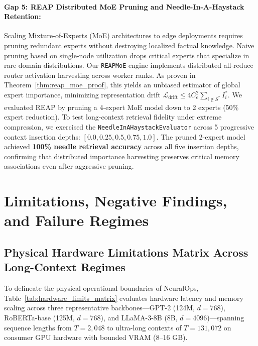 \documentclass{article}
\begin{document}
\paragraph{Gap 5: REAP Distributed MoE Pruning and Needle-In-A-Haystack Retention:}
Scaling Mixture-of-Experts (MoE) architectures to edge deployments requires pruning redundant experts without destroying localized factual knowledge. Naive pruning based on single-node utilization drops critical experts that specialize in rare domain distributions. 
Our \texttt{REAPMoE} engine implements distributed all-reduce router activation harvesting across worker ranks. As proven in Theorem~\ref{thm:reap_moe_proof}, this yields an unbiased estimator of global expert importance, minimizing representation drift $\mathcal{L}_{\text{drift}} \le 4 C_e^2 \sum_{i \notin S^*} I_i^*$. 
We evaluated REAP by pruning a 4-expert MoE model down to 2 experts (50\% expert reduction). To test long-context retrieval fidelity under extreme compression, we exercised the \texttt{NeedleInAHaystackEvaluator} across 5 progressive context insertion depths: $[0.0, 0.25, 0.5, 0.75, 1.0]$. The pruned 2-expert model achieved \textbf{100\% needle retrieval accuracy} across all five insertion depths, confirming that distributed importance harvesting preserves critical memory associations even after aggressive pruning.

\section{Limitations, Negative Findings, and Failure Regimes}
\label{sec:limitations}

\subsection{Physical Hardware Limitations Matrix Across Long-Context Regimes}
\label{sec:hardware_limitations_matrix}
To delineate the physical operational boundaries of NeuralOps, Table~\ref{tab:hardware_limits_matrix} evaluates hardware latency and memory scaling across three representative backbones---GPT-2 (124M, $d=768$), RoBERTa-base (125M, $d=768$), and LLaMA-3-8B (8B, $d=4096$)---spanning sequence lengths from $T=2,048$ to ultra-long contexts of $T=131,072$ on consumer GPU hardware with bounded VRAM (8--16 GB).
\end{document}

